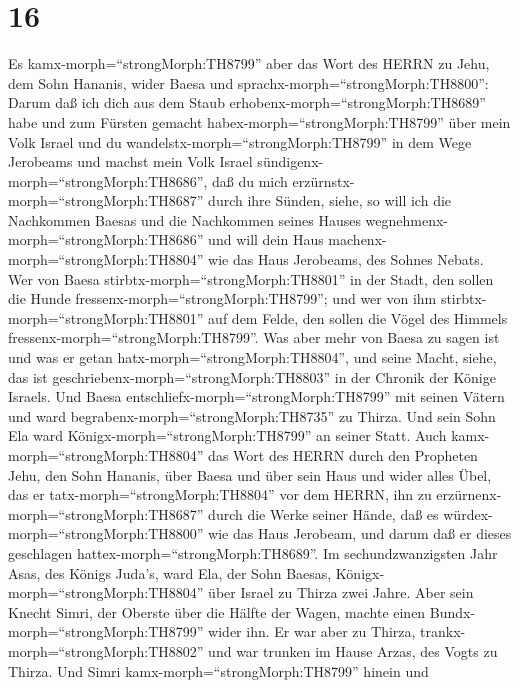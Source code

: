 \hypertarget{section-15}{%
\section{16}\label{section-15}}

 Es kamx-morph=``strongMorph:TH8799'' aber das Wort des
HERRN zu Jehu, dem Sohn Hananis, wider Baesa und
sprachx-morph=``strongMorph:TH8800'':  Darum daß ich dich
aus dem Staub erhobenx-morph=``strongMorph:TH8689'' habe und zum Fürsten
gemacht habex-morph=``strongMorph:TH8799'' über mein Volk Israel und du
wandelstx-morph=``strongMorph:TH8799'' in dem Wege Jerobeams und machst
mein Volk Israel sündigenx-morph=``strongMorph:TH8686'', daß du mich
erzürnstx-morph=``strongMorph:TH8687'' durch ihre Sünden, 
siehe, so will ich die Nachkommen Baesas und die Nachkommen seines
Hauses wegnehmenx-morph=``strongMorph:TH8686'' und will dein Haus
machenx-morph=``strongMorph:TH8804'' wie das Haus Jerobeams, des Sohnes
Nebats.  Wer von Baesa stirbtx-morph=``strongMorph:TH8801''
in der Stadt, den sollen die Hunde
fressenx-morph=``strongMorph:TH8799''; und wer von ihm
stirbtx-morph=``strongMorph:TH8801'' auf dem Felde, den sollen die Vögel
des Himmels fressenx-morph=``strongMorph:TH8799''.  Was aber
mehr von Baesa zu sagen ist und was er getan
hatx-morph=``strongMorph:TH8804'', und seine Macht, siehe, das ist
geschriebenx-morph=``strongMorph:TH8803'' in der Chronik der Könige
Israels.  Und Baesa entschliefx-morph=``strongMorph:TH8799''
mit seinen Vätern und ward begrabenx-morph=``strongMorph:TH8735'' zu
Thirza. Und sein Sohn Ela ward Königx-morph=``strongMorph:TH8799'' an
seiner Statt.  Auch kamx-morph=``strongMorph:TH8804'' das
Wort des HERRN durch den Propheten Jehu, den Sohn Hananis, über Baesa
und über sein Haus und wider alles Übel, das er
tatx-morph=``strongMorph:TH8804'' vor dem HERRN, ihn zu
erzürnenx-morph=``strongMorph:TH8687'' durch die Werke seiner Hände, daß
es würdex-morph=``strongMorph:TH8800'' wie das Haus Jerobeam, und darum
daß er dieses geschlagen hattex-morph=``strongMorph:TH8689''.
 Im sechundzwanzigsten Jahr Asas, des Königs Juda's, ward
Ela, der Sohn Baesas, Königx-morph=``strongMorph:TH8804'' über Israel zu
Thirza zwei Jahre.  Aber sein Knecht Simri, der Oberste über
die Hälfte der Wagen, machte einen Bundx-morph=``strongMorph:TH8799''
wider ihn. Er war aber zu Thirza, trankx-morph=``strongMorph:TH8802''
und war trunken im Hause Arzas, des Vogts zu Thirza.  Und
Simri kamx-morph=``strongMorph:TH8799'' hinein und
